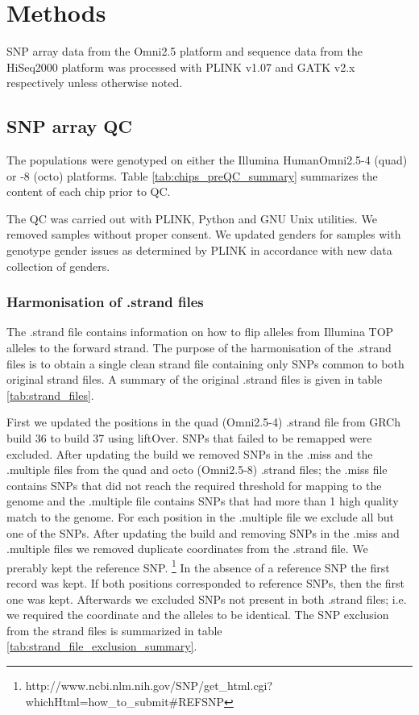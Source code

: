\section{Methods}

SNP array data from the Omni2.5 platform and sequence data from the HiSeq2000 platform was processed with PLINK v1.07 and \gls{GATK} v2.x respectively unless otherwise noted.

\subsection{SNP array QC}
\label{subsec:chipQC}
The populations were genotyped on either the Illumina HumanOmni2.5-4 (quad) or -8 (octo) platforms. Table \ref{tab:chips_preQC_summary} summarizes the content of each chip prior to QC.



The \gls{QC} was carried out with PLINK\cite{Purcell2007}, Python and GNU Unix utilities. We removed samples without proper consent. We updated genders for samples with genotype gender issues as determined by PLINK in accordance with new data collection of genders.

\subsubsection{Harmonisation of .strand files}
The .strand file contains information on how to flip alleles from Illumina TOP alleles to the forward strand. The purpose of the harmonisation of the .strand files is to obtain a single clean strand file containing only SNPs common to both original strand files. A summary of the original .strand files is given in table \ref{tab:strand_files}.


First we updated the positions in the quad (Omni2.5-4) .strand file from \gls{GRCh}\cite{10.1371/journal.pbio.1001091} build 36 to build 37 using liftOver.\cite{Karolchik01012014} SNPs that failed to be remapped were excluded. After updating the build we removed \glspl{SNP} in the .miss and the .multiple files from the quad and octo (Omni2.5-8) .strand files; the .miss file contains \glspl{SNP} that did not reach the required threshold for mapping to the genome and the .multiple file contains \glspl{SNP} that had more than 1 high quality match to the genome. For each position in the .multiple file we exclude all but one of the \glspl{SNP}.
After updating the build and removing \glspl{SNP} in the .miss and .multiple files we removed duplicate coordinates from the .strand file. We prerably kept the reference \gls{SNP}. \footnote{http://www.ncbi.nlm.nih.gov/SNP/get\_html.cgi?whichHtml=how\_to\_submit\#REFSNP} In the absence of a reference SNP the first record was kept. If both positions corresponded to reference SNPs, then the first one was kept.
Afterwards we excluded \glspl{SNP} not present in both .strand files; i.e. we required the coordinate and the alleles to be identical. The SNP exclusion from the strand files is summarized in table \ref{tab:strand_file_exclusion_summary}.


